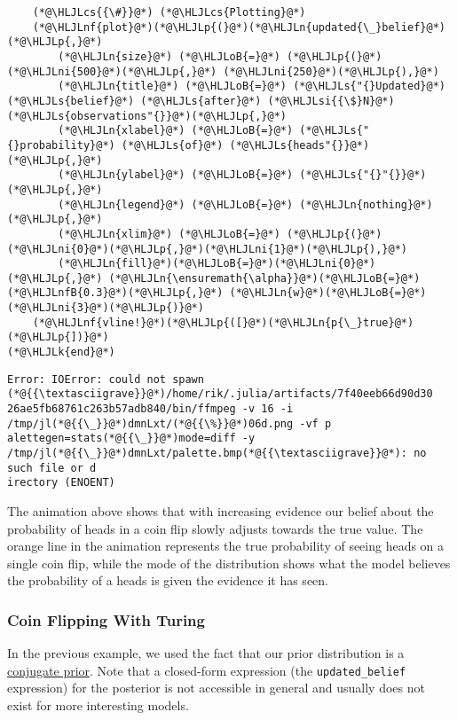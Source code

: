 \documentclass[12pt,a4paper]{article}
\newcommand{\HLJLk}[1]{\textcolor[RGB]{148,91,176}{\textbf{#1}}}
\newcommand{\HLJLn}[1]{#1}
\newcommand{\HLJLnf}[1]{\textcolor[RGB]{66,102,213}{#1}}
\newcommand{\HLJLs}[1]{\textcolor[RGB]{201,61,57}{#1}}
\newcommand{\HLJLsi}[1]{#1}
\newcommand{\HLJLnfB}[1]{\textcolor[RGB]{59,151,46}{#1}}
\newcommand{\HLJLni}[1]{\textcolor[RGB]{59,151,46}{#1}}
\newcommand{\HLJLoB}[1]{\textcolor[RGB]{102,102,102}{\textbf{#1}}}
\newcommand{\HLJLp}[1]{#1}
\newcommand{\HLJLcs}[1]{\textcolor[RGB]{153,153,119}{\textit{#1}}}
\begin{document}
\begin{lstlisting}
    (*@\HLJLcs{{\#}}@*) (*@\HLJLcs{Plotting}@*)
    (*@\HLJLnf{plot}@*)(*@\HLJLp{(}@*)(*@\HLJLn{updated{\_}belief}@*)(*@\HLJLp{,}@*) 
        (*@\HLJLn{size}@*) (*@\HLJLoB{=}@*) (*@\HLJLp{(}@*)(*@\HLJLni{500}@*)(*@\HLJLp{,}@*) (*@\HLJLni{250}@*)(*@\HLJLp{),}@*) 
        (*@\HLJLn{title}@*) (*@\HLJLoB{=}@*) (*@\HLJLs{"{}Updated}@*) (*@\HLJLs{belief}@*) (*@\HLJLs{after}@*) (*@\HLJLsi{{\$}N}@*) (*@\HLJLs{observations"{}}@*)(*@\HLJLp{,}@*)
        (*@\HLJLn{xlabel}@*) (*@\HLJLoB{=}@*) (*@\HLJLs{"{}probability}@*) (*@\HLJLs{of}@*) (*@\HLJLs{heads"{}}@*)(*@\HLJLp{,}@*) 
        (*@\HLJLn{ylabel}@*) (*@\HLJLoB{=}@*) (*@\HLJLs{"{}"{}}@*)(*@\HLJLp{,}@*) 
        (*@\HLJLn{legend}@*) (*@\HLJLoB{=}@*) (*@\HLJLn{nothing}@*)(*@\HLJLp{,}@*)
        (*@\HLJLn{xlim}@*) (*@\HLJLoB{=}@*) (*@\HLJLp{(}@*)(*@\HLJLni{0}@*)(*@\HLJLp{,}@*)(*@\HLJLni{1}@*)(*@\HLJLp{),}@*)
        (*@\HLJLn{fill}@*)(*@\HLJLoB{=}@*)(*@\HLJLni{0}@*)(*@\HLJLp{,}@*) (*@\HLJLn{\ensuremath{\alpha}}@*)(*@\HLJLoB{=}@*)(*@\HLJLnfB{0.3}@*)(*@\HLJLp{,}@*) (*@\HLJLn{w}@*)(*@\HLJLoB{=}@*)(*@\HLJLni{3}@*)(*@\HLJLp{)}@*)
    (*@\HLJLnf{vline!}@*)(*@\HLJLp{([}@*)(*@\HLJLn{p{\_}true}@*)(*@\HLJLp{])}@*)
(*@\HLJLk{end}@*)
\end{lstlisting}

\begin{lstlisting}
Error: IOError: could not spawn (*@{{\textasciigrave}}@*)/home/rik/.julia/artifacts/7f40eeb66d90d30
26ae5fb68761c263b57adb840/bin/ffmpeg -v 16 -i /tmp/jl(*@{{\_}}@*)dmnLxt/(*@{{\%}}@*)06d.png -vf p
alettegen=stats(*@{{\_}}@*)mode=diff -y /tmp/jl(*@{{\_}}@*)dmnLxt/palette.bmp(*@{{\textasciigrave}}@*): no such file or d
irectory (ENOENT)
\end{lstlisting}


The animation above shows that with increasing evidence our belief about the probability of heads in a coin flip slowly adjusts towards the true value. The orange line in the animation represents the true probability of seeing heads on a single coin flip, while the mode of the distribution shows what the model believes the probability of a heads is given the evidence it has seen.

\subsubsection{Coin Flipping With Turing}
In the previous example, we used the fact that our prior distribution is a \href{https://en.wikipedia.org/wiki/Conjugate_prior}{conjugate prior}. Note that a closed-form expression (the \texttt{updated\_belief} expression) for the posterior is not accessible in general and usually does not exist for more interesting models. 
\end{document}
